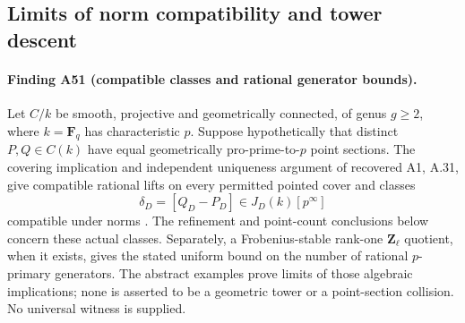 \documentclass[11pt,a4paper]{article}
\begin{document}
\subsection{Limits of norm compatibility and tower descent}
\label{sec:norm-compatibility-towers}

\paragraph{Finding A51 (compatible classes and rational generator bounds).}
Let $C/k$ be smooth, projective and geometrically connected,
of genus $g\ge2$, where $k=\mathbf F_q$ has characteristic $p$.
Suppose hypothetically that distinct $P,Q\in C(k)$ have equal
geometrically pro-prime-to-$p$ point sections. The covering
implication and independent uniqueness argument of recovered
A1, A.31, give compatible rational lifts on every permitted
pointed cover and classes
\[
       \delta_D=[Q_D-P_D]\in J_D(k)[p^\infty]
       \tag{NC.1}
\]
compatible under norms \cite[claim A.31]{A1run}.
The refinement and point-count conclusions below concern these
actual classes. Separately, a Frobenius-stable rank-one
$\mathbf Z_\ell$ quotient, when it exists, gives the stated
uniform bound on the number of rational $p$-primary generators.
The abstract examples prove limits of those algebraic
implications; none is asserted to be a geometric tower or
a point-section collision. No universal witness is supplied.
\end{document}
